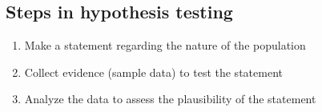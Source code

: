 \documentclass{report}
\begin{document}

    \pagebreak 
    \subsection*{Steps in hypothesis testing}
    \bigbreak \noindent 
    \begin{enumerate}
        \item Make a statement regarding the nature of the population
        \item Collect evidence (sample data) to test the statement
        \item Analyze the data to assess the plausibility of the statement
    \end{enumerate}
\end{document}

